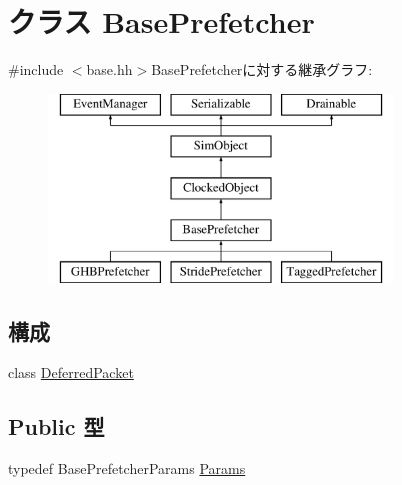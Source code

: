 \hypertarget{classBasePrefetcher}{
\section{クラス BasePrefetcher}
\label{classBasePrefetcher}
}


{\ttfamily \#include $<$base.hh$>$}BasePrefetcherに対する継承グラフ:\begin{figure}[H]
\begin{center}
\leavevmode
\includegraphics[height=5cm]{classBasePrefetcher}
\end{center}
\end{figure}
\subsection*{構成}
\begin{DoxyCompactItemize}
\item 
class \hyperlink{classBasePrefetcher_1_1DeferredPacket}{DeferredPacket}
\end{DoxyCompactItemize}
\subsection*{Public 型}
\begin{DoxyCompactItemize}
\item 
typedef BasePrefetcherParams \hyperlink{classBasePrefetcher_a46661f02a5642b04fd4e12f645ad9c5c}{Params}
\end{DoxyCompactItemize}
